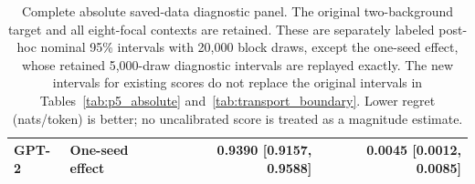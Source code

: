 \begin{table}[tp]
\begin{tabular}{llrr}
GPT-2 & One-seed effect & 0.9390 [0.9157, 0.9588] & 0.0045 [0.0012, 0.0085] \\
\bottomrule
\end{tabular}
\caption{Complete absolute saved-data diagnostic panel. The original two-background target and all eight-focal contexts are retained. These are separately labeled post-hoc nominal 95\% intervals with 20,000 block draws, except the one-seed effect, whose retained 5,000-draw diagnostic intervals are replayed exactly. The new intervals for existing scores do not replace the original intervals in Tables~\ref{tab:p5_absolute} and~\ref{tab:transport_boundary}. Lower regret (nats/token) is better; no uncalibrated score is treated as a magnitude estimate.}
\label{tab:review_absolute}
\end{table}
